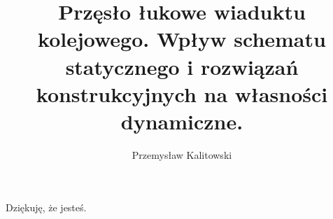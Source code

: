 
\title{Przęsło łukowe wiaduktu kolejowego. Wpływ schematu statycznego i rozwiązań konstrukcyjnych na własności dynamiczne.}
\author{Przemysław Kalitowski}



\begin{sloppypar}
\frontmatter

\myemptypage



\myemptypage





\thispagestyle{empty}
\vspace*{20cm}
\hfill Dziękuję, że jesteś.
\vfill
\pagebreak[4]


\myemptypage


\tableofcontents
\newpage






\mainmatter




	





	





\printbibliography[heading=bibintoc]
\end{sloppypar}
